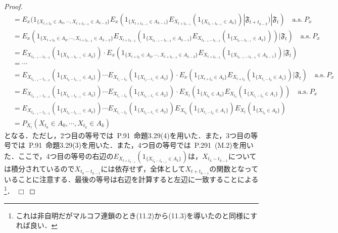 \documentclass[dvipdfmx]{jsarticle}
\newtheorem{proof}{証明}
\def\qed{\hfill $\Box$}
\begin{document}
\begin{proof}
\begin{align*}
&=E_x(1_{\{X_{t+t_0}\in A_0,\cdots,X_{t+t_{k-2}}\in A_{k-2}\}}E_x(1_{\{X_{t+t_{k-1}}\in A_{k-1}\}}E_{X_{t+t_{k-1}}}(1_{\{X_{t_k-t_{k-1}}\in A_k\}})|\mathfrak{F}_{t+t_{k-2}})|\mathfrak{F}_t) \quad \mathrm{a.s.}{\ }P_x \\
&=E_x(1_{\{X_{t+t_0}\in A_0,\cdots,X_{t+t_{k-2}}\in A_{k-2}\}}E_{X_{t+t_{k-2}}}(1_{\{X_{t_{k-1}-t_{k-2}}\in A_{k-1}\}}E_{X_{t_{k-1}-t_{k-2}}}(1_{\{X_{t_k-t_{k-1}}\in A_k\}}))|\mathfrak{F}_t) \quad \mathrm{a.s.}{\ }P_x \\
%
&=E_{X_{t_{k-1}-t_{k-2}}}(1_{\{X_{t_k-t_{k-1}}\in A_k\}})\cdot E_x(1_{\{X_{t+t_0}\in A_0,\cdots,X_{t+t_{k-2}}\in A_{k-2}\}}E_{X_{t+t_{k-2}}}(1_{\{X_{t_{k-1}-t_{k-2}}\in A_{k-1}\}})|\mathfrak{F}_t) \\
&=\cdots \\
&=E_{X_{t_{k-1}-t_{k-2}}}(1_{\{X_{t_k-t_{k-1}}\in A_k\}})\cdots E_{X_{t_{1}-t_{0}}}(1_{\{X_{t_2-t_{1}}\in A_2\}})\cdot E_x(1_{\{X_{t+t_0}\in A_0\}}E_{X_{t+t_{0}}}(1_{\{X_{t_1-t_{0}}\in A_1\}})|\mathfrak{F}_t) \quad \mathrm{a.s.}{\ }P_x \\
&=E_{X_{t_{k-1}-t_{k-2}}}(1_{\{X_{t_k-t_{k-1}}\in A_k\}})\cdots E_{X_{t_{1}-t_{0}}}(1_{\{X_{t_2-t_{1}}\in A_2\}})\cdot E_{X_t}(1_{\{X_{t_0}\in A_0\}}E_{X_{t_{0}}}(1_{\{X_{t_1-t_{0}}\in A_1\}})) \quad \mathrm{a.s.}{\ }P_x \\
&=E_{X_{t_{k-1}-t_{k-2}}}(1_{\{X_{t_k-t_{k-1}}\in A_k\}})\cdots E_{X_{t_{1}-t_{0}}}(1_{\{X_{t_2-t_{1}}\in A_2\}})E_{X_{t_{0}}}(1_{\{X_{t_1-t_{0}}\in A_1\}})E_{X_t}(1_{\{X_{t_0}\in A_0\}}) \\
&=P_{X_t}(X_{t_0}\in A_0,\cdots,X_{t_k}\in A_k)
\end{align*}
となる．ただし，2つ目の等号では\cite{funaki}{\ }P.91{\ }命題3.29(4)を用いた．また，3つ目の等号では\cite{funaki}{\ }P.91{\ }命題3.29(3)を用いた．また，4つ目の等号では\cite{kotani}{\ }P.291{\ }(M.2)を用いた．ここで，4つ目の等号の右辺の$E_{X_{t+t_{k-1}}}(1_{\{X_{t_k-t_{k-1}}\in A_k\}})$は，$X_{t_k-t_{k-1}}$については積分されているので$X_{t_k-t_{k-1}}$には依存せず，全体として$X_{t+t_{k-1}}$の関数となっていることに注意する．最後の等号は右辺を計算すると左辺に一致することによる\footnote{これは非自明だがマルコフ連鎖のとき(11.2)から(11.3)を導いたのと同様にすれば良い．}．
\qed
\end{proof}
%
%
%
%
\end{document}
